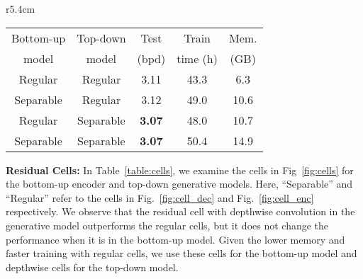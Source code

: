 \documentclass{article}
\begin{document}
\begin{wraptable}{r}{5.4cm}
\vspace{-5mm}
\centering
{\footnotesize
\setlength{\tabcolsep}{1pt}
\caption{\small Residual cells in NVAE}\label{table:cells}
    \begin{tabular}{ccccc}
    \toprule
    Bottom-up    & Top-down & Test & Train & Mem. \\
    model    & model & (bpd) & time (h) & (GB) \\
    \midrule
    Regular      & Regular   & 3.11  & 43.3  & 6.3  \\
    Separable    & Regular   & 3.12  & 49.0  & 10.6 \\
    Regular      & Separable & \bf 3.07  & 48.0  & 10.7 \\
    Separable    & Separable & \bf 3.07  & 50.4  & 14.9 \\
    \bottomrule
    \end{tabular}
}
\vspace{-4mm}
\end{wraptable}\textbf{Residual Cells:} In Table~\ref{table:cells}, we examine the cells in Fig~\ref{fig:cells} for the bottom-up encoder and top-down generative models. Here, ``Separable'' and ``Regular'' refer to the cells in Fig.~\ref{fig:cell_dec} and Fig.~\ref{fig:cell_enc} respectively. We observe that the residual cell with depthwise convolution in the generative model outperforms the regular cells, but it does not change the performance when it is in the bottom-up model. Given the lower memory and faster training with regular cells, we use these cells for the bottom-up model and depthwise cells for the top-down model. 
\end{document}
